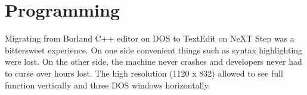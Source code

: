 \pagebreak
\section{Programming}
Migrating from Borland C++ editor on DOS to TextEdit on NeXT Step was a bittersweet experience. On one side convenient things such as syntax highlighting were lost. On the other side, the machine never crashes and developers never had to curse over hours lost. The high resolution (1120 x 832) allowed to see full function vertically and three DOS windows horizontally. \\
\par
{}
